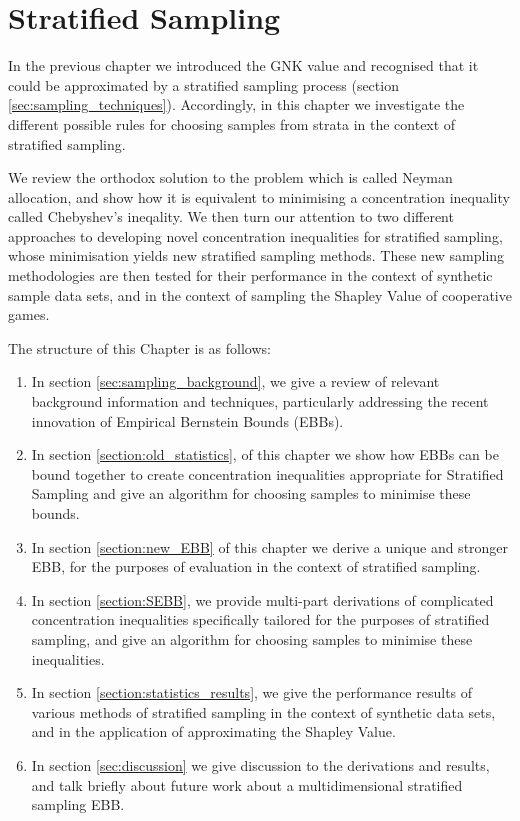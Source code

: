 \chapter{Stratified Sampling}\label{chap:stratified_sampling_chapter}

In the previous chapter we introduced the GNK value and recognised that it could be approximated by a stratified sampling process (section \ref{sec:sampling_techniques}).
Accordingly, in this chapter we investigate the different possible rules for choosing samples from strata in the context of stratified sampling.

We review the orthodox solution to the problem which is called Neyman allocation, and show how it is equivalent to minimising a concentration inequality called Chebyshev's ineqality.
We then turn our attention to two different approaches to developing novel concentration inequalities for stratified sampling, whose minimisation yields new stratified sampling methods.
These new sampling methodologies are then tested for their performance in the context of synthetic sample data sets, and in the context of sampling the Shapley Value of cooperative games.

The structure of this Chapter is as follows:
\begin{enumerate}
\item	In section \ref{sec:sampling_background}, we give a review of relevant background information and techniques, particularly addressing the recent innovation of Empirical Bernstein Bounds (EBBs).
\item	In section \ref{section:old_statistics}, of this chapter we show how EBBs can be bound together to create concentration inequalities appropriate for Stratified Sampling and give an algorithm for choosing samples to minimise these bounds.
\item	In section \ref{section:new_EBB} of this chapter we derive a unique and stronger EBB, for the purposes of evaluation in the context of stratified sampling.
\item	In section \ref{section:SEBB}, we provide multi-part derivations of complicated concentration inequalities specifically tailored for the purposes of stratified sampling, and give an algorithm for choosing samples to minimise these inequalities.
\item	In section \ref{section:statistics_results}, we give the performance results of various methods of stratified sampling in the context of synthetic data sets, and in the application of approximating the Shapley Value.
\item	In section \ref{sec:discussion} we give discussion to the derivations and results, and talk briefly about future work about a multidimensional stratified sampling EBB.
\end{enumerate}


